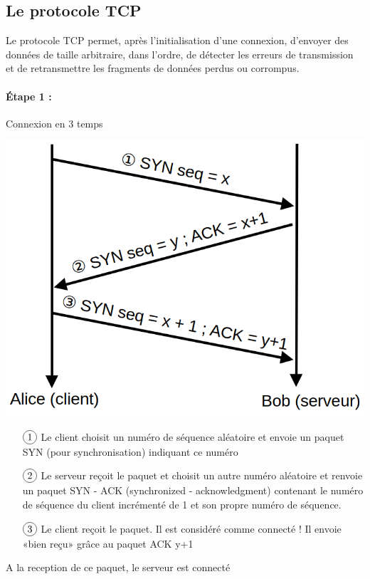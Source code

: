 \subsection{Le protocole TCP}

\begin{principe}
	\label{25-tcp}
	Le protocole TCP permet, après l'initialisation d'une connexion, d'envoyer des données de taille arbitraire, dans l'ordre, de détecter les erreurs de transmission et de retransmettre les fragments de données perdus ou corrompus.
\end{principe}

\paragraph{Étape 1 :} Connexion en 3 temps\\
\begin{minipage}{0.4\linewidth}
	\includegraphics[width=\linewidth]{lecon/25-client-serveur/3-temps.png}
\end{minipage} \quad\begin{minipage}{0.55\linewidth}
	\begin{itemize}
		\item[$\circled{1}$] Le client choisit un numéro de séquence aléatoire et envoie un paquet SYN (pour synchronisation) indiquant ce numéro
		\item[$\circled{2}$] Le serveur reçoit le paquet et choisit un autre numéro aléatoire et renvoie un paquet SYN - ACK (synchronized - acknowledgment) contenant le numéro de séquence du client incrémenté de 1 et son propre numéro de séquence.
		\item[$\circled{3}$] Le client reçoit le paquet. Il est considéré comme connecté ! Il envoie «bien reçu» grâce au paquet ACK y+1
	\end{itemize}
	A la reception de ce paquet, le serveur est connecté
\end{minipage}

